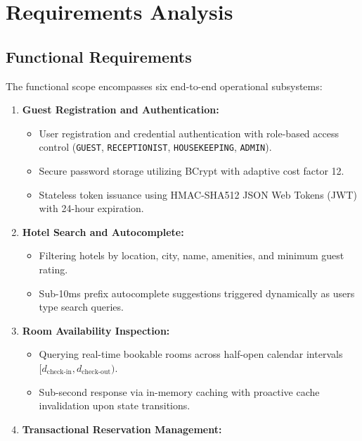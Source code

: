 \documentclass[11pt,a4paper]{article}
\begin{document}
\section{Requirements Analysis}

\subsection{Functional Requirements}
The functional scope encompasses six end-to-end operational subsystems:
\begin{enumerate}
    \item \textbf{Guest Registration and Authentication:}
    \begin{itemize}
        \item User registration and credential authentication with role-based access control (\texttt{GUEST}, \texttt{RECEPTIONIST}, \texttt{HOUSEKEEPING}, \texttt{ADMIN}).
        \item Secure password storage utilizing BCrypt with adaptive cost factor 12.
        \item Stateless token issuance using HMAC-SHA512 JSON Web Tokens (JWT) with 24-hour expiration.
    \end{itemize}
    \item \textbf{Hotel Search and Autocomplete:}
    \begin{itemize}
        \item Filtering hotels by location, city, name, amenities, and minimum guest rating.
        \item Sub-10ms prefix autocomplete suggestions triggered dynamically as users type search queries.
    \end{itemize}
    \item \textbf{Room Availability Inspection:}
    \begin{itemize}
        \item Querying real-time bookable rooms across half-open calendar intervals\\
        \([d_{\text{check-in}}, d_{\text{check-out}})\).
        \item Sub-second response via in-memory caching with proactive cache invalidation upon state transitions.
    \end{itemize}
    \item \textbf{Transactional Reservation Management:}

\end{enumerate}
\end{document}
